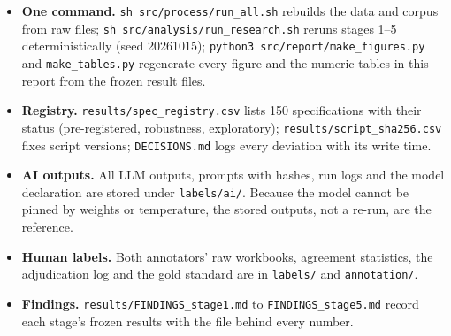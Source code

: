 \documentclass[11pt]{article}
\begin{document}
\begin{itemize}
  \item \textbf{One command.} \texttt{sh src/process/run\_all.sh} rebuilds the data and corpus from raw files; \texttt{sh src/analysis/run\_research.sh} reruns stages 1–5 deterministically (seed 20261015); \texttt{python3 src/report/make\_figures.py} and \texttt{make\_tables.py} regenerate every figure and the numeric tables in this report from the frozen result files.
  \item \textbf{Registry.} \texttt{results/spec\_registry.csv} lists 150 specifications with their status (pre-registered, robustness, exploratory); \texttt{results/script\_sha256.csv} fixes script versions; \texttt{DECISIONS.md} logs every deviation with its write time.
  \item \textbf{AI outputs.} All LLM outputs, prompts with hashes, run logs and the model declaration are stored under \texttt{labels/ai/}. Because the model cannot be pinned by weights or temperature, the stored outputs, not a re-run, are the reference.
  \item \textbf{Human labels.} Both annotators' raw workbooks, agreement statistics, the adjudication log and the gold standard are in \texttt{labels/} and \texttt{annotation/}.
  \item \textbf{Findings.} \texttt{results/FINDINGS\_stage1.md} to \texttt{FINDINGS\_stage5.md} record each stage's frozen results with the file behind every number.
\end{itemize}
\end{document}
